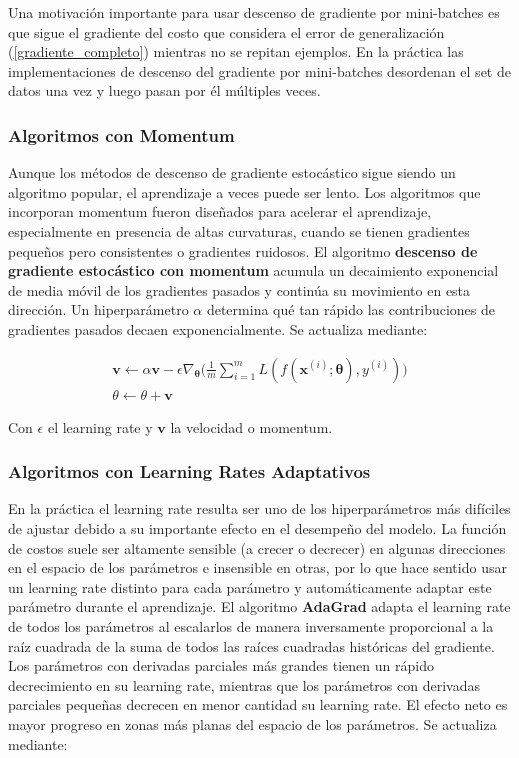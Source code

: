 Una motivaci\'on importante para usar descenso de gradiente por mini-batches es que sigue el gradiente del costo que considera el error de generalizaci\'on (\ref{gradiente_completo}) mientras no se repitan ejemplos. En la pr\'actica las implementaciones de descenso del gradiente por mini-batches desordenan el set de datos una vez y luego pasan por \'el m\'ultiples veces.

\subsubsection{Algoritmos con Momentum}

Aunque los métodos de descenso de gradiente estoc\'astico sigue siendo un algoritmo popular, el aprendizaje a veces puede ser lento. Los algoritmos que incorporan momentum fueron dise{\~{n}}ados para acelerar el aprendizaje, especialmente en presencia de altas curvaturas, cuando se tienen gradientes peque{\~{n}}os pero consistentes o gradientes ruidosos. El algoritmo \textbf{descenso de gradiente estoc\'astico con momentum} acumula un decaimiento exponencial de media m\'ovil de los gradientes pasados y contin\'ua su movimiento en esta direcci\'on. Un hiperpar\'ametro $\alpha$ determina qu\'e tan r\'apido las contribuciones de gradientes pasados decaen exponencialmente. Se actualiza mediante:

\begin{gather*}
\bm{v} \longleftarrow \alpha\bm{v} - \epsilon\nabla_{\bm{\theta}}\Big(\frac{1}{m}\sum_{i=1}^{m}L(f(\bm{x}^{(i)};\bm{\theta}),y^{(i)})\Big)
\\
\theta \longleftarrow \theta + \bm{v}
\end{gather*}

Con $\epsilon$ el learning rate y $\bm{v}$ la velocidad o momentum.

\subsubsection{Algoritmos con Learning Rates Adaptativos}

En la pr\'actica el learning rate resulta ser uno de los hiperpar\'ametros m\'as dif\'iciles de ajustar debido a su importante efecto en el desempe{\~{n}}o del modelo. La funci\'on de costos suele ser altamente sensible (a crecer o decrecer) en algunas direcciones en el espacio de los par\'ametros e insensible en otras, por lo que hace sentido usar un learning rate distinto para cada par\'ametro y autom\'aticamente adaptar este par\'ametro durante el aprendizaje. El algoritmo \textbf{AdaGrad} adapta el learning rate de todos los par\'ametros al escalarlos de manera inversamente proporcional a la ra\'iz cuadrada de la suma de todos las ra\'ices cuadradas hist\'oricas del gradiente. Los par\'ametros con derivadas parciales m\'as grandes tienen un r\'apido decrecimiento en su learning rate, mientras que los par\'ametros con derivadas parciales peque{\~{n}}as decrecen en menor cantidad su learning rate. El efecto neto es mayor progreso en zonas m\'as planas del espacio de los par\'ametros. Se actualiza mediante:

